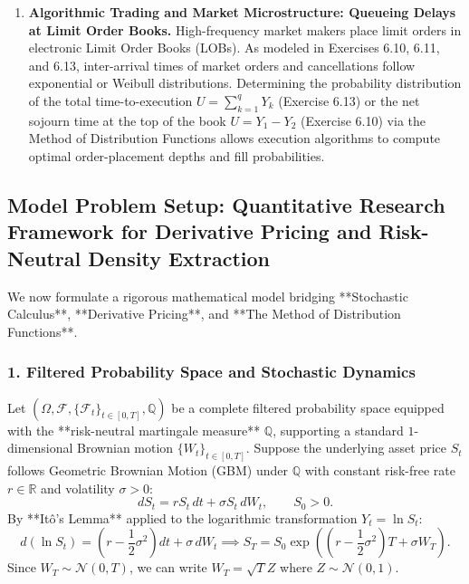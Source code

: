 \documentclass[11pt, letterpaper]{article}
\theoremstyle{definition}
\theoremstyle{remark}
\newcommand{\R}{\mathbb{R}}
\newcommand{\Q}{\mathbb{Q}}
\newcommand{\F}{\mathcal{F}}
\begin{document}
\begin{enumerate}
    \item \textbf{Algorithmic Trading and Market Microstructure: Queueing Delays at Limit Order Books.}
    High-frequency market makers place limit orders in electronic Limit Order Books (LOBs). As modeled in Exercises 6.10, 6.11, and 6.13, inter-arrival times of market orders and cancellations follow exponential or Weibull distributions. Determining the probability distribution of the total time-to-execution $U = \sum_{k=1}^q Y_k$ (Exercise 6.13) or the net sojourn time at the top of the book $U = Y_1 - Y_2$ (Exercise 6.10) via the Method of Distribution Functions allows execution algorithms to compute optimal order-placement depths and fill probabilities.
\end{enumerate}

\subsection{Model Problem Setup: Quantitative Research Framework for Derivative Pricing and Risk-Neutral Density Extraction}

We now formulate a rigorous mathematical model bridging **Stochastic Calculus**, **Derivative Pricing**, and **The Method of Distribution Functions**.

\subsubsection*{1. Filtered Probability Space and Stochastic Dynamics}
Let $(\Omega, \F, \{\F_t\}_{t \in [0, T]}, \Q)$ be a complete filtered probability space equipped with the **risk-neutral martingale measure** $\Q$, supporting a standard $1$-dimensional Brownian motion $\{W_t\}_{t \in [0, T]}$. Suppose the underlying asset price $S_t$ follows Geometric Brownian Motion (GBM) under $\Q$ with constant risk-free rate $r \in \R$ and volatility $\sigma > 0$:
\[
    dS_t = r S_t\,dt + \sigma S_t\,dW_t, \qquad S_0 > 0.
\]
By **It\^{o}'s Lemma** applied to the logarithmic transformation $Y_t = \ln S_t$:
\[
    d(\ln S_t) = \left(r - \frac{1}{2}\sigma^2\right)dt + \sigma\,dW_t \implies S_T = S_0 \exp\left( \left(r - \frac{1}{2}\sigma^2\right)T + \sigma W_T \right).
\]
Since $W_T \sim \mathcal{N}(0, T)$, we can write $W_T = \sqrt{T} Z$ where $Z \sim \mathcal{N}(0, 1)$.
\end{document}
